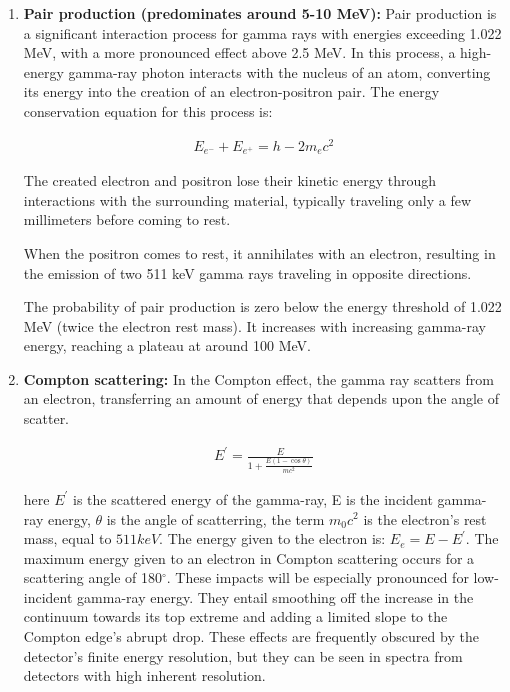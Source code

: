 \begin{enumerate}
        \item \textbf{Pair production (predominates around 5-10 MeV):} Pair production is a significant interaction process for gamma rays with energies exceeding 1.022 MeV, with a more pronounced effect above 2.5 MeV. In this process, a high-energy gamma-ray photon interacts with the nucleus of an atom, converting its energy into the creation of an electron-positron pair. The energy conservation equation for this process is:

        \begin{align}E_{e^-} + E_{e^+} = h - 2m_ec^2 \end{align}

        The created electron and positron lose their kinetic energy through interactions with the surrounding material, typically traveling only a few millimeters before coming to rest.

        When the positron comes to rest, it annihilates with an electron, resulting in the emission of two 511 keV gamma rays traveling in opposite directions.

        The probability of pair production is zero below the energy threshold of 1.022 MeV (twice the electron rest mass). It increases with increasing gamma-ray energy, reaching a plateau at around 100 MeV.\\
    
        \item \textbf{Compton scattering:} In the Compton effect, the gamma ray scatters from an electron, transferring an amount of energy that depends upon the angle of scatter.

        \begin{align}E^{'} = \frac{E}{1+\frac{E(1-\cos\theta)}{mc^2}}\end{align}

        here $E^{'}$ is the scattered energy of the gamma-ray,	E is the incident gamma-ray energy, $\theta$ is the angle of scatterring, the term $m_0c^2$ is the electron's rest mass, equal to $511 keV$. The energy given to the electron is: $E_e=E-E^{'}$. The maximum energy given to an electron in Compton scattering occurs for a scattering angle of 180$^{\circ}$. These impacts will be especially pronounced for low-incident gamma-ray energy. They entail smoothing off the increase in the continuum towards its top extreme and adding a limited slope to the Compton edge's abrupt drop. These effects are frequently obscured by the detector's finite energy resolution, but they can be seen in spectra from detectors with high inherent resolution.
    
    \end{enumerate}
